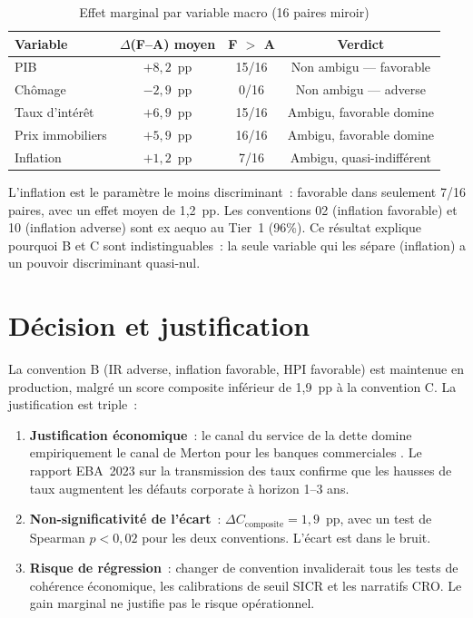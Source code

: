 \documentclass[12pt, a4paper, twoside, openright]{report}
\theoremstyle{definition}
\begin{document}
\begin{table}[htbp]
\centering
\caption{Effet marginal par variable macro (16 paires miroir)}
\label{tab:marginal-conv}
\begin{tabular}{lccc}
\toprule
\textbf{Variable} & $\Delta$\textbf{(F--A) moyen} & \textbf{F $>$ A} & \textbf{Verdict} \\
\midrule
PIB & $+8{,}2$~pp & 15/16 & Non ambigu --- favorable \\
Chômage & $-2{,}9$~pp & 0/16 & Non ambigu --- adverse \\
Taux d'intérêt & $+6{,}9$~pp & 15/16 & Ambigu, favorable domine \\
Prix immobiliers & $+5{,}9$~pp & 16/16 & Ambigu, favorable domine \\
Inflation & $+1{,}2$~pp & 7/16 & Ambigu, quasi-indifférent \\
\bottomrule
\end{tabular}
\end{table}

L'inflation est le paramètre le moins discriminant~: favorable dans seulement 7/16 paires, avec un effet moyen de 1,2~pp. Les conventions 02 (inflation favorable) et 10 (inflation adverse) sont ex aequo au Tier~1 (96\%). Ce résultat explique pourquoi B et C sont indistinguables~: la seule variable qui les sépare (inflation) a un pouvoir discriminant quasi-nul.


\section{Décision et justification}
\label{sec:conv-decision}

La convention B (IR adverse, inflation favorable, HPI favorable) est maintenue en production, malgré un score composite inférieur de 1,9~pp à la convention C. La justification est triple~:

\begin{enumerate}
\item \textbf{Justification économique}~: le canal du service de la dette domine empiriquement le canal de Merton pour les banques commerciales \citep{duffie2007}. Le rapport EBA~2023 sur la transmission des taux confirme que les hausses de taux augmentent les défauts corporate à horizon 1--3 ans.
\item \textbf{Non-significativité de l'écart}~: $\Delta C_{\text{composite}} = 1{,}9$~pp, avec un test de Spearman $p < 0{,}02$ pour les deux conventions. L'écart est dans le bruit.
\item \textbf{Risque de régression}~: changer de convention invaliderait tous les tests de cohérence économique, les calibrations de seuil SICR et les narratifs CRO. Le gain marginal ne justifie pas le risque opérationnel.
\end{enumerate}
\end{document}
